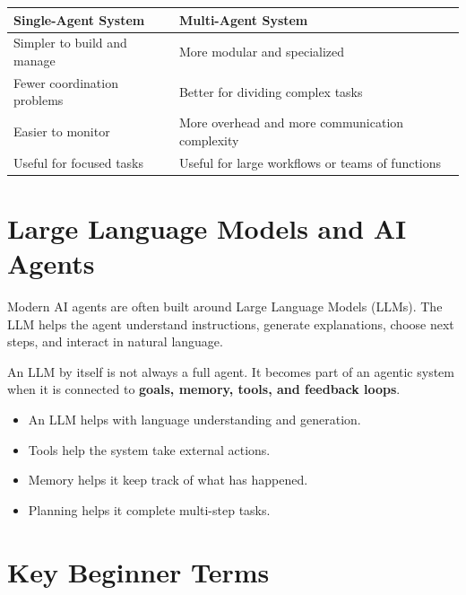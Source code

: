 \documentclass[11pt,a4paper]{article}
\begin{document}
\begin{center}
\begin{tabular}{@{}p{6.3cm}p{6.3cm}@{}}
\toprule
\textbf{Single-Agent System} & \textbf{Multi-Agent System} \\
\midrule
Simpler to build and manage & More modular and specialized \\
Fewer coordination problems & Better for dividing complex tasks \\
Easier to monitor & More overhead and more communication complexity \\
Useful for focused tasks & Useful for large workflows or teams of functions \\
\bottomrule
\end{tabular}
\end{center}

\section{Large Language Models and AI Agents}

\begin{definitionbox}
Modern AI agents are often built around Large Language Models (LLMs). The LLM helps the agent understand instructions, generate explanations, choose next steps, and interact in natural language.
\end{definitionbox}

\begin{conceptbox}
An LLM by itself is not always a full agent. It becomes part of an agentic system when it is connected to \textbf{goals, memory, tools, and feedback loops}.
\end{conceptbox}

\begin{itemize}[leftmargin=*]
  \item An LLM helps with language understanding and generation.
  \item Tools help the system take external actions.
  \item Memory helps it keep track of what has happened.
  \item Planning helps it complete multi-step tasks.
\end{itemize}

\section{Key Beginner Terms}
\end{document}
